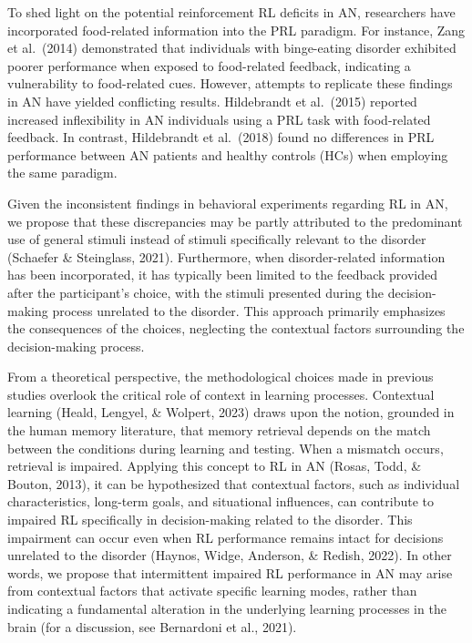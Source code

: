 \documentclass[
  man,floatsintext]{apa6}
\begin{document}
To shed light on the potential reinforcement RL deficits in AN, researchers have incorporated food-related information into the PRL paradigm. For instance, Zang et al.~(2014) demonstrated that individuals with binge-eating disorder exhibited poorer performance when exposed to food-related feedback, indicating a vulnerability to food-related cues. However, attempts to replicate these findings in AN have yielded conflicting results. Hildebrandt et al.~(2015) reported increased inflexibility in AN individuals using a PRL task with food-related feedback. In contrast, Hildebrandt et al.~(2018) found no differences in PRL performance between AN patients and healthy controls (HCs) when employing the same paradigm.

Given the inconsistent findings in behavioral experiments regarding RL in AN, we propose that these discrepancies may be partly attributed to the predominant use of general stimuli instead of stimuli specifically relevant to the disorder (Schaefer \& Steinglass, 2021). Furthermore, when disorder-related information has been incorporated, it has typically been limited to the feedback provided after the participant's choice, with the stimuli presented during the decision-making process unrelated to the disorder. This approach primarily emphasizes the consequences of the choices, neglecting the contextual factors surrounding the decision-making process.

From a theoretical perspective, the methodological choices made in previous studies overlook the critical role of context in learning processes. Contextual learning (Heald, Lengyel, \& Wolpert, 2023) draws upon the notion, grounded in the human memory literature, that memory retrieval depends on the match between the conditions during learning and testing. When a mismatch occurs, retrieval is impaired. Applying this concept to RL in AN (Rosas, Todd, \& Bouton, 2013), it can be hypothesized that contextual factors, such as individual characteristics, long-term goals, and situational influences, can contribute to impaired RL specifically in decision-making related to the disorder. This impairment can occur even when RL performance remains intact for decisions unrelated to the disorder (Haynos, Widge, Anderson, \& Redish, 2022). In other words, we propose that intermittent impaired RL performance in AN may arise from contextual factors that activate specific learning modes, rather than indicating a fundamental alteration in the underlying learning processes in the brain (for a discussion, see Bernardoni et al., 2021).
\end{document}
